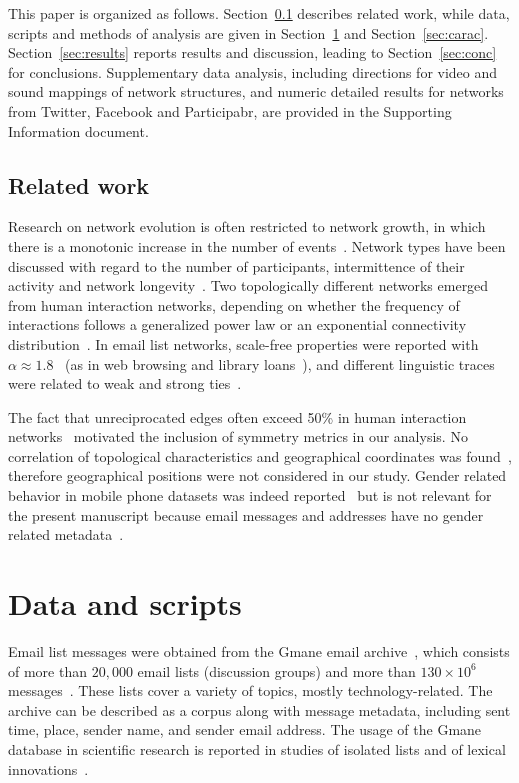 \documentclass[%
	aip,
	jmp,%
	amsmath,amssymb,
	reprint,%
]{revtex4-1}
\begin{document}
This paper is organized as follows. Section~\ref{sec:related} describes related work, while data, scripts and methods of analysis are given in Section~\ref{sec:data} and Section~\ref{sec:carac}.
Section~\ref{sec:results} reports results and discussion, leading to Section~\ref{sec:conc} for conclusions.
Supplementary data analysis, including directions for video and sound mappings of network structures, and numeric detailed results for networks from Twitter, Facebook and Participabr, are provided in the Supporting Information document.


\subsection{Related work}\label{sec:related}
Research on network evolution is often restricted to network growth, in which there is a monotonic increase in the number of events~\cite{barabasiEvo}.
Network types have been discussed with regard to the number of participants, intermittence of their activity and network longevity~\cite{barabasiEvo}. Two topologically different networks emerged from human interaction networks, depending on whether the frequency of interactions follows a generalized power law or an exponential connectivity distribution~\cite{barabasiTopologicalEv}. In email list networks, scale-free properties were reported with $\alpha \approx 1.8$~\cite{bird} (as in web browsing and library loans~\cite{barabasiHumanDyn}), and different linguistic traces were related to weak and strong ties~\cite{Gmane2}.

The fact that unreciprocated edges often exceed 50\% in human interaction networks~\cite{newmanEvolving} motivated the inclusion of symmetry metrics in our analysis.
No correlation of topological characteristics and geographical coordinates was found~\cite{barabasiGeo},
therefore geographical positions were not considered in our study.
Gender related behavior in mobile phone datasets was indeed reported~\cite{barabasiSex}
but is not relevant for the present manuscript because email messages and addresses have no gender related metadata~\cite{gmanePack}.


\section{Data and scripts}\label{sec:data}\label{scripts}

Email list messages were obtained from
the Gmane email archive~\cite{gmanePack}, which consists of more than $20,000$
email lists (discussion groups) and more than $130\times 10^6$ messages~\cite{Gmanewikipedia}. These lists cover a variety of topics, mostly technology-related. The archive can be described as a corpus along with message metadata, including sent time, place, sender name, and sender email address.
The usage of the Gmane database in scientific research is reported in studies of isolated lists and of lexical innovations~\cite{Gmane2,bird}. 
\end{document}
